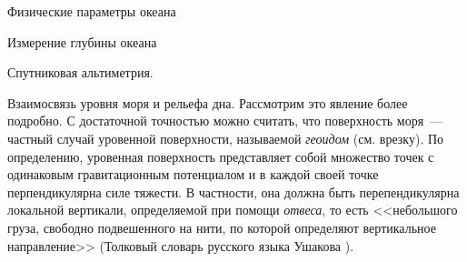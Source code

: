 \begin{chapter}{Физические параметры океана}
\begin{section}{Измерение глубины океана}
\begin{paragraph}{Спутниковая альтиметрия.}
\begin{subparagraph}{Взаимосвязь уровня моря и рельефа дна.}
Рассмотрим это явление более подробно. С достаточной точностью можно считать, 
что поверхность моря~--- частный случай уровенной поверхности, называемой
\emph{геоидом} (см. врезку). 
\label{LevelSurface}По определению, уровенная поверхность 
представляет собой множество точек с одинаковым гравитационным потенциалом
и в каждой своей точке перпендикулярна силе тяжести. 
В частности, она должна быть перепендикулярна локальной вертикали, определяемой
при помощи \emph{отвеса}, то есть <<небольшого груза, свободно подвешенного 
на нити, по которой определяют вертикальное направление>> (Толковый словарь 
русского языка Ушакова%
).
%


\end{subparagraph}
\end{paragraph}
\end{section}
\end{chapter}
